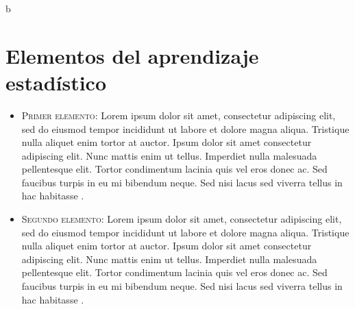 b\documentclass[12pt]{article}
\begin{document}
\begin{figure}[h]
\end{figure}

\newpage
\section{Elementos del aprendizaje estadístico}

\begin{itemize}
    \item \textsc{Primer elemento}: Lorem ipsum dolor sit amet, consectetur adipiscing elit, sed do eiusmod tempor incididunt ut labore et dolore magna aliqua. Tristique nulla aliquet enim tortor at auctor. Ipsum dolor sit amet consectetur adipiscing elit. Nunc mattis enim ut tellus. Imperdiet nulla malesuada pellentesque elit. Tortor condimentum lacinia quis vel eros donec ac. Sed faucibus turpis in eu mi bibendum neque. Sed nisi lacus sed viverra tellus in hac habitasse \cite{1}.

    \item \textsc{Segundo elemento}: Lorem ipsum dolor sit amet, consectetur adipiscing elit, sed do eiusmod tempor incididunt ut labore et dolore magna aliqua. Tristique nulla aliquet enim tortor at auctor. Ipsum dolor sit amet consectetur adipiscing elit. Nunc mattis enim ut tellus. Imperdiet nulla malesuada pellentesque elit. Tortor condimentum lacinia quis vel eros donec ac. Sed faucibus turpis in eu mi bibendum neque. Sed nisi lacus sed viverra tellus in hac habitasse \cite{2}.
\end{itemize}
\end{document}
